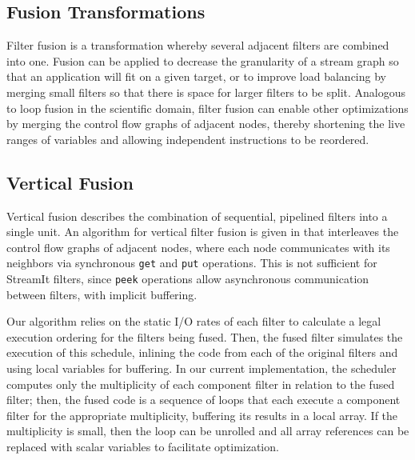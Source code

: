\subsection{Fusion Transformations}

Filter fusion is a transformation whereby several adjacent filters are
combined into one.  Fusion can be applied to decrease the granularity
of a stream graph so that an application will fit on a given target,
or to improve load balancing by merging small filters so that there is
space for larger filters to be split.  Analogous to loop fusion in the
scientific domain, filter fusion can enable other optimizations by
merging the control flow graphs of adjacent nodes, thereby shortening
the live ranges of variables and allowing independent instructions to
be reordered.

\subsection{Vertical Fusion}

Vertical fusion describes the combination of sequential, pipelined
filters into a single unit.  An algorithm for vertical filter fusion
is given in \cite{pro96} that interleaves the control flow graphs of
adjacent nodes, where each node communicates with its neighbors via
synchronous {\tt get} and {\tt put} operations.  This is not
sufficient for StreamIt filters, since {\tt peek} operations allow
asynchronous communication between filters, with implicit buffering.

Our algorithm relies on the static I/O rates of each filter to
calculate a legal execution ordering for the filters being fused.
Then, the fused filter simulates the execution of this schedule,
inlining the code from each of the original filters and using local
variables for buffering.  In our current implementation, the scheduler
computes only the multiplicity of each component filter in relation to
the fused filter; then, the fused code is a sequence of loops that
each execute a component filter for the appropriate multiplicity,
buffering its results in a local array.  If the multiplicity is small,
then the loop can be unrolled and all array references can be replaced
with scalar variables to facilitate optimization.


